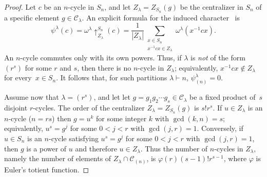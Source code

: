 \documentclass[10pt]{article}
\theoremstyle{definition}
\newcommand{\C}{\mathcal C}
\def\x#1{(\textnormal{mod}\ x^{#1})}
\begin{document}
\begin{proof}
    Let $c$ be an $n$-cycle in $S_n$, and let  $Z_\lambda = Z_{S_n}(g)$ be the centralizer in $S_n$ of a specific element $g\in \C_\lambda$. 
    An explicit formula for the induced character~\cite[(5.1)]{Isaacs} is
    \[
        \psi^\lambda(c)=\omega^\lambda\uparrow_{Z_\lambda}^{S_n}(c)=\frac{1}{|Z_\lambda|}\sum_{\substack{x\in S_n\\x^{-1}cx\in Z_\lambda}}\omega^\lambda(x^{-1}cx).
    \]
    An $n$-cycle commutes only with its own powers. Thus, if $\lambda$ is {\em not} of the form $(r^s)$ for some $r$ and $s$, 
    then there is no $n$-cycle in $Z_\lambda$;
    equivalently, $x^{-1}cx \not\in Z_\lambda$ for every~$x\in S_n$. 
    It follows that, for such partitions $\lambda \vdash n$, $\psi^\lambda_{(n)}=0$.

    Assume now that $\lambda= (r^s)$, and let let $g = g_1 g_2 \cdots g_s \in \C_\lambda$ be a fixed  product of~$s$ disjoint $r$-cycles. 
    The order of the centralizer 
    $Z_\lambda = Z_{S_n}(g)$ is $s!r^s$. 
    If $u \in Z_\lambda$ is an $n$-cycle ($n = rs$) then 
    $g = u^k$ for some integer $k$ with $\gcd(k,n) = s$;
    equivalently, $u^s = g^j$ for some $0 < j < r$ with $\gcd(j,r) = 1$.
    Conversely, if $u \in S_n$ is an $n$-cycle satisfying 
    $u^s = g^j$ for some $0 < j < r$ with $\gcd(j,r) = 1$, then $g$ is a power of $u$ and therefore $u \in Z_\lambda$.
    Thus the number of $n$-cycles in $Z_\lambda$, namely the number of elements of $Z_\lambda \cap \C_{(n)}$, is $\varphi(r) (s-1)! r^{s-1}$, where $\varphi$ is Euler's totient function. 


\end{proof}
\end{document}
